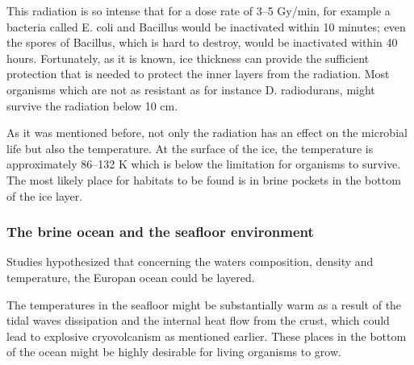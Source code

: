 This radiation is so intense that for a  dose rate of 3–5 Gy/min, for example a bacteria called E. coli and Bacillus would be inactivated within 10 minutes; even the spores of Bacillus, which is hard to destroy, would be inactivated within 40 hours.
Fortunately, as it is known, ice thickness can provide the sufficient protection that is needed to protect the inner layers from the radiation. Most organisms which are not as resistant as for instance D. radiodurans, might survive the radiation below 10 cm.

As it was mentioned before, not only the radiation has an effect on the microbial life but also the temperature. At the surface of the ice, the temperature is approximately 86–132 K which is below the limitation for organisms to survive. The most likely place for habitats to be found is in brine pockets in the bottom of the ice layer.

\subsubsection{The brine ocean and the seafloor environment}

Studies hypothesized that concerning the waters composition, density and temperature, the Europan ocean could be layered.

The temperatures in the seafloor might be substantially warm as a result of the tidal waves dissipation and the internal heat flow from the crust, which could lead to explosive cryovolcanism as mentioned earlier. These places in the bottom of the ocean might be highly desirable for living organisms to grow.
